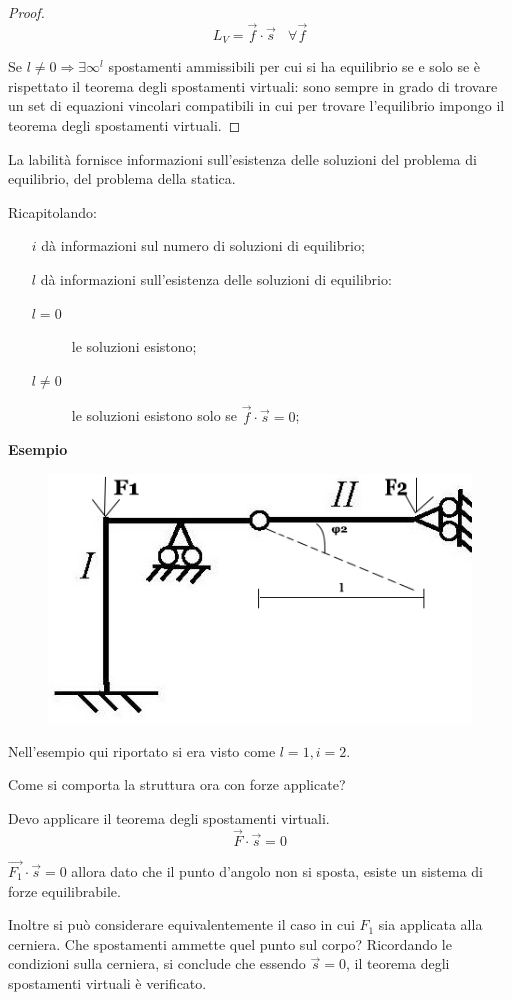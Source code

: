 \documentclass{article}
\begin{document}
\begin{adjustwidth}{2in}{}
\begin{proof}
\[ L_V = \vec{f} \cdot \vec{s} ~~~~ \forall \vec{f} \]
 
 Se $l \ne 0 \Rightarrow \exists \infty^l$ spostamenti ammissibili per cui si ha equilibrio se e solo se è rispettato il teorema degli spostamenti virtuali: sono sempre in grado di trovare un set di equazioni vincolari compatibili in cui per trovare l'equilibrio impongo il teorema degli spostamenti virtuali. \newline 
\end{proof}
 
 La labilità fornisce informazioni sull'esistenza delle soluzioni del problema di equilibrio, del problema della statica. \newline
 
 Ricapitolando: 
 \begin{itemize}
 	\item[$ i $] dà informazioni sul numero di soluzioni di equilibrio; 
 	\item[$ l $] dà informazioni sull'esistenza delle soluzioni di equilibrio:
 	\begin{description}
 		\item[$l = 0$] le soluzioni esistono;
 		\item[$l\ne0$] le soluzioni esistono solo se $\vec{f} \cdot \vec{s} = 0$;
 	\end{description}
 \end{itemize} 

	\textbf{Esempio} 
	\begin{figure}[H]
		\centering
		\includegraphics[width=0.4\linewidth]{immagini/1.PARTE4_Pagina_09}
	\end{figure}
	Nell'esempio qui riportato si era visto come $l=1, i=2$. 
	
	Come si comporta la struttura ora con forze applicate? \newline 
	
	Devo applicare il teorema degli spostamenti virtuali. 
	\[ \vec{F}\cdot\vec{s}=0\]
	
	$\vec{F_1} \cdot \vec{s} = 0$ allora dato che il punto d'angolo non si sposta, esiste un sistema di forze equilibrabile.
	
	Inoltre si può considerare equivalentemente il caso in cui $F_1$ sia applicata alla cerniera. Che spostamenti ammette quel punto sul corpo? Ricordando le condizioni sulla cerniera, si conclude che essendo $\vec{s} = 0$, il teorema degli spostamenti virtuali è verificato. \newline
	

\end{adjustwidth}
\end{document}
